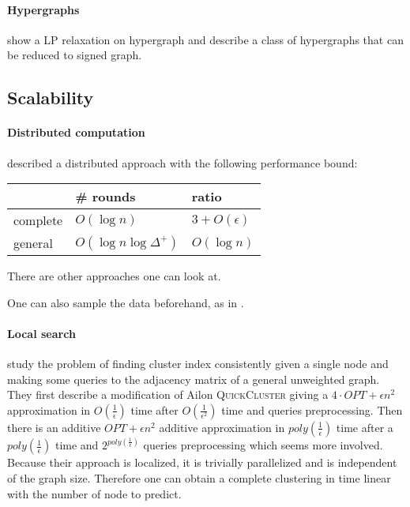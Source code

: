 \paragraph{Hypergraphs} \Textcite{Kim2011} show a LP relaxation on hypergraph
and \textcite{Ricatte13} describe a class of hypergraphs that can be reduced
to signed graph.

\subsection{Scalability}
\paragraph{Distributed computation}
\Textcite{Chierichetti2014} described a distributed approach with the
following performance bound:

\begin{tabular}{lll}
	\toprule
	& \# rounds  & ratio \\
	\midrule
	complete & $O(\log n)$ & $3 + O(\epsilon)$ \\
	general & $O(\log n\log{\Delta^+})$ & $O(\log{n})$ \\
	\bottomrule
\end{tabular}

There are other approaches \autocite[Part III]{bonchi2014correlation} one can
look at.

One can also sample the data beforehand, as in \autocite{Bertolacci07}.

\paragraph{Local search}
\Textcite{Bonchi2013} study the problem of finding cluster index consistently
given a single node and making some queries to the adjacency matrix of a
general unweighted graph. They first describe a modification of Ailon
\textsc{QuickCluster} giving a $4\cdot OPT + \epsilon n^2$ approximation in
$O(\frac{1}{\epsilon})$ time after $O(\frac{1}{\epsilon^2})$ time and queries
preprocessing. Then there is an additive $OPT + \epsilon n^2$ additive
approximation in $poly(\frac{1}{\epsilon})$ time after a
$poly(\frac{1}{\epsilon})$ time and $2^{poly(\frac{1}{\epsilon})}$ queries
preprocessing which seems more involved.  Because their approach is localized,
it is trivially parallelized and is independent of the graph size. Therefore
one can obtain a complete clustering in time linear with the number of node to
predict.
